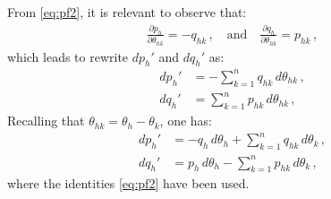 \documentclass[journal, twocolumn, letter]{IEEEtran}
\newcommand{\thk}{\theta_{hk}}
\newcommand{\ph}{p_h}
\newcommand{\qh}{q_h}
\renewcommand{\th}{\theta_h}
\newcommand{\tk}{\theta_k}
\newcommand{\tho}{\theta_{h}}
\newcommand{\tko}{\theta_{k}}
\newcommand{\fp}[2]{\frac{\partial #1}{\partial #2}}
\newcommand{\sk}{{\textstyle \sum}_{k=1}^{n}}
\newcommand{\phk}{p_{hk}}
\newcommand{\qhk}{q_{hk}}
\begin{document}
From \eqref{eq:pf2}, it is relevant to observe that:
\begin{equation}
  \begin{aligned}
    \fp{\ph}{\thk} =-\qhk \, , \quad \text{and} \quad
    \fp{\qh}{\thk} = \phk \, ,
  \end{aligned}
\end{equation}
which leads to rewrite $d \ph'$ and $d \qh'$ as:
\begin{equation}
  \label{eq:dpq1}
  \begin{aligned}
    d \ph' &=-\sk \qhk \, d \thk \, , \\
    d \qh' &= \sk \phk \, d \thk \, ,
  \end{aligned}
\end{equation}
Recalling that $\thk = \th - \tk$, one has:
\begin{equation}
  \label{eq:dpq1c}
  \begin{aligned}
    d \ph' &= - \qh \, d \tho + \sk \qhk \, d \tko \, , \\
    d \qh' &= \ph \, d \tho - \sk \phk \, d \tko \, ,
  \end{aligned}
\end{equation}
where the identities \eqref{eq:pf2} have been used.
\end{document}

